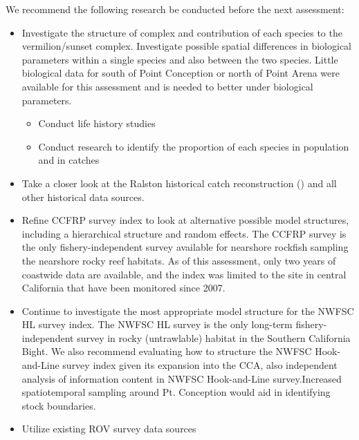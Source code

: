 \documentclass[
  english,
  a4paper,
]{article}
\providecommand{\tightlist}{%
  \setlength{\itemsep}{0pt}\setlength{\parskip}{0pt}}
\begin{document}
We recommend the following research be conducted before the next assessment:

\begin{itemize}
\item
  Investigate the structure of complex and contribution of each species to the
  vermilion/sunset complex. Investigate possible spatial differences in biological parameters within
  a single species and also between the two species. Little biological data for south of
  Point Conception or north of Point Arena were available for this assessment and is needed
  to better under biological parameters.

  \begin{itemize}
  \tightlist
  \item
    Conduct life history studies
  \item
    Conduct research to identify the proportion of each species in population and in catches
  \end{itemize}
\item
  Take a closer look at the Ralston historical catch reconstruction (\cite{Ralston2010}) and
  all other historical data sources.
\item
  Refine CCFRP survey index to look at alternative possible model structures, including
  a hierarchical structure and random effects. The CCFRP survey is the only
  fishery-independent survey available for nearshore rockfish sampling the nearshore rocky
  reef habitats. As of this assessment, only two years of coastwide data are available,
  and the index was limited to the site in central California that have been monitored
  since 2007.
\item
  Continue to investigate the most appropriate model structure for the NWFSC HL survey index.
  The NWFSC HL survey is the only long-term fishery-independent survey in rocky (untrawlable) habitat
  in the Southern California Bight. We also recommend evaluating how to structure the NWFSC Hook-and-Line survey index given its expansion into the CCA, also independent analysis of information content in NWFSC Hook-and-Line survey.Increased spatiotemporal sampling around Pt. Conception would aid in identifying stock boundaries.
\item
  Utilize existing ROV survey data sources


\end{itemize}
\end{document}
